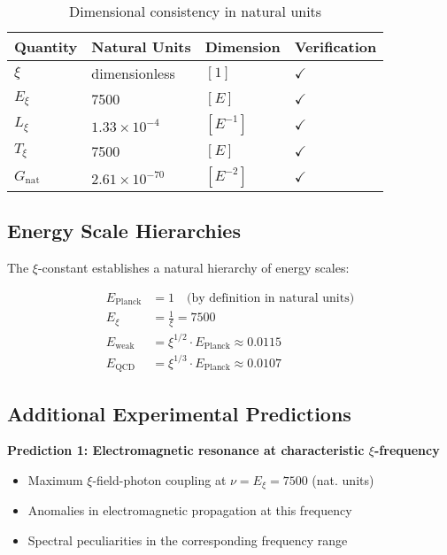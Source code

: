 \documentclass[12pt,a4paper]{article}
\theoremstyle{definition}
\theoremstyle{remark}
\begin{document}
	\begin{table}[h]
		\centering
		\begin{tabular}{l l l l}
			\toprule
			Quantity & Natural Units & Dimension & Verification \\
			\midrule
			$\xi$ & dimensionless & $[1]$ & $\checkmark$ \\
			$E_\xi$ & 7500 & $[E]$ & $\checkmark$ \\
			$L_\xi$ & $1.33 \times 10^{-4}$ & $[E^{-1}]$ & $\checkmark$ \\
			$T_\xi$ & 7500 & $[E]$ & $\checkmark$ \\
			$G_{\text{nat}}$ & $2.61 \times 10^{-70}$ & $[E^{-2}]$ & $\checkmark$ \\
			\bottomrule
		\end{tabular}
		\caption{Dimensional consistency in natural units}
	\end{table}
	
	\subsection{Energy Scale Hierarchies}
	
	The $\xi$-constant establishes a natural hierarchy of energy scales:
	
	\begin{align}
		E_{\text{Planck}} &= 1 \quad \text{(by definition in natural units)} \\
		E_\xi &= \frac{1}{\xi} = 7500 \\
		E_{\text{weak}} &= \xi^{1/2} \cdot E_{\text{Planck}} \approx 0.0115 \\
		E_{\text{QCD}} &= \xi^{1/3} \cdot E_{\text{Planck}} \approx 0.0107
	\end{align}
	
	\subsection{Additional Experimental Predictions}
	
	\textbf{Prediction 1: Electromagnetic resonance at characteristic $\xi$-frequency}
	\begin{itemize}
		\item Maximum $\xi$-field-photon coupling at $\nu = E_\xi = 7500$ (nat. units)
		\item Anomalies in electromagnetic propagation at this frequency
		\item Spectral peculiarities in the corresponding frequency range
	\end{itemize}
	
\end{document}
